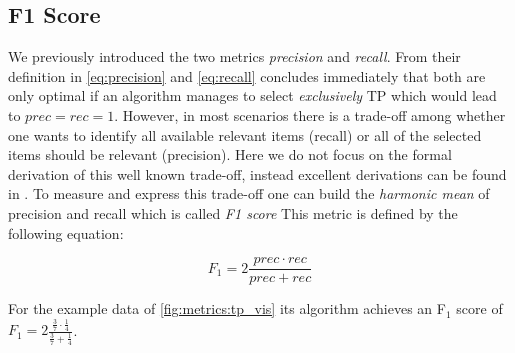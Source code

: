 \subsection{F1 Score}
\label{chp:fundamentals:sec:metrics:subsec:f1_score}

We previously introduced the two metrics \textit{precision} and \textit{recall}.
From their definition in \cref{eq:precision} and \cref{eq:recall} concludes immediately that both are only optimal if an algorithm manages to select \textit{exclusively} \ac{TP} which would lead to $prec = rec = 1$.
However, in most scenarios there is a trade-off among whether one wants to identify all available relevant items (recall) or all of the selected items should be relevant (precision).
Here we do not focus on the formal derivation of this well known trade-off, instead excellent derivations can be found in \textcites{Gordon:1989}{Zhu:2004}.
To measure and express this trade-off one can build the \textit{harmonic mean} of precision and recall which is called \textit{F1 score} \parencite{Powers:2011}
This metric is defined by the following equation:

\begin{equation}\label{eq:f1_score}
    F_1 = 2 \frac{prec \cdot rec}{prec+rec}
\end{equation}

For the example data of \cref{fig:metrics:tp_vis} its algorithm achieves an F$_1$ score of $F_1 = 2 \frac{\frac{3}{7} \cdot \frac{1}{4}}{\frac{3}{7}+\frac{1}{4}}$.
